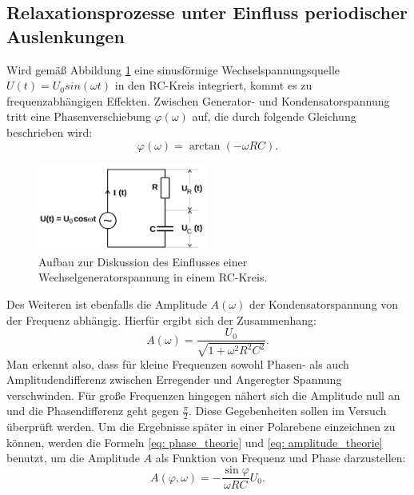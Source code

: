 \subsection{Relaxationsprozesse unter Einfluss periodischer Auslenkungen}
Wird gemäß Abbildung \ref{fig: aufbau_2} eine sinusförmige Wechselspannungsquelle $U(t) = U_0sin(\omega t)$ in den RC-Kreis integriert, kommt es zu frequenzabhängigen
Effekten. Zwischen Generator- und Kondensatorspannung tritt eine Phasenverschiebung $\varphi(\omega)$ auf, die durch folgende Gleichung
beschrieben wird:
\begin{equation}
  \varphi(\omega) = \arctan(-\omega RC).
  \label{eq: phase_theorie}
\end{equation}
\FloatBarrier
\begin{figure}
  \centering
\includegraphics[width = 0.5\textwidth]{pics/aufbau_2.png}
\caption{Aufbau zur Diskussion des Einflusses einer Wechselgeneratorspannung in einem RC-Kreis\cite{anleitung353}. }
\label{fig: aufbau_2}
\end{figure}
Des Weiteren ist ebenfalls die Amplitude $A(\omega)$ der Kondensatorspannung von der Frequenz abhängig. Hierfür ergibt sich der Zusammenhang:
\begin{equation}
  A(\omega) = \frac{U_0}{\sqrt{1 +\omega^2R^2C^2}}.
  \label{eq: amplitude_theorie}
\end{equation}
Man erkennt also, dass für kleine Frequenzen sowohl Phasen- als auch Amplitudendifferenz zwischen Erregender und Angeregter Spannung verschwinden.
Für große Frequenzen hingegen nähert sich die Amplitude null an und die Phasendifferenz geht gegen $\frac{\pi}{2}$. Diese Gegebenheiten sollen
im Versuch überprüft werden. Um die Ergebnisse später in einer Polarebene einzeichnen zu können, werden die Formeln \eqref{eq: phase_theorie} und
\eqref{eq: amplitude_theorie} benutzt, um die Amplitude $A$ als Funktion von Frequenz und Phase darzustellen:
\begin{equation}
  \label{eq:phase}
  A(\varphi, \omega) = -\frac{\sin{\varphi}}{\omega R C}U_0.
\end{equation}

